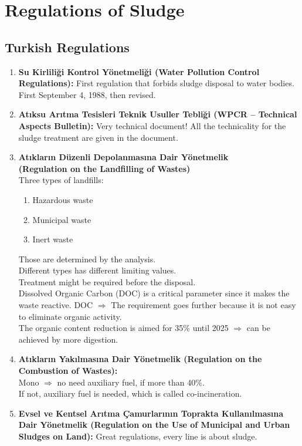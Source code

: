 \documentclass{article}
\numberwithin{equation}{section}
\begin{document}
\section{Regulations of Sludge}
\subsection{Turkish Regulations}
\begin{enumerate}
    \item \textbf{Su Kirliliği Kontrol Yönetmeliği (Water Pollution Control Regulations):} First regulation that forbids sludge disposal to water bodies.\\
    First September 4, 1988, then revised.
    \item \textbf{Atıksu Arıtma Tesisleri Teknik Usuller Tebliği (WPCR -- Technical Aspects Bulletin):} Very technical document! All the technicality for the sludge treatment are given in the document.
    \item \textbf{Atıkların Düzenli Depolanmasına Dair Yönetmelik\\(Regulation on the Landfilling of Wastes)}\\
    Three types of landfills:
    \begin{enumerate}
        \item Hazardous waste
        \item Municipal waste
        \item Inert waste
    \end{enumerate}
    Those are determined by the analysis.\\
    Different types has different limiting values.\\
    Treatment might be required before the disposal.\\
    Dissolved Organic Carbon (DOC) is a critical parameter since it makes the waste reactive. DOC $\Rightarrow$ The requirement goes further because it is not easy to eliminate organic activity.\\
    The organic content reduction is aimed for 35\% until 2025 $\Rightarrow$ can be achieved by more digestion.
    \item \textbf{Atıkların Yakılmasına Dair Yönetmelik (Regulation on the Combustion of Wastes):}\\
    Mono $\Rightarrow$ no need auxiliary fuel, if more than 40\%.\\
    If not, auxiliary fuel is needed, which is called co-incineration.
    \item \textbf{Evsel ve Kentsel Arıtma Çamurlarının Toprakta Kullanılmasına Dair Yönetmelik (Regulation on the Use of Municipal and Urban Sludges on Land):} Great regulations, every line is about sludge.\\

\end{enumerate}
\end{document}
